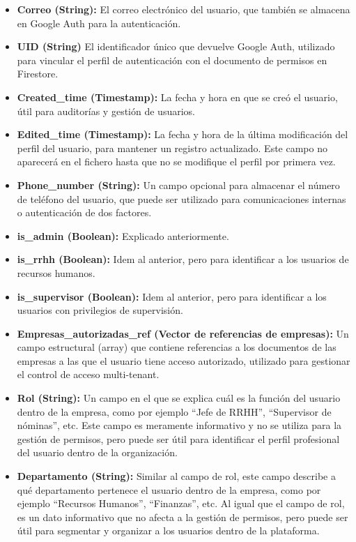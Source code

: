 \begin{itemize}
    \item \textbf{Correo (String): } El correo electrónico del usuario, que también se almacena en Google Auth para la autenticación.
    \item \textbf{UID (String)} El identificador único que devuelve Google Auth, utilizado para vincular el perfil de autenticación con el documento de permisos en Firestore.
    \item \textbf{Created\_time (Timestamp):} La fecha y hora en que se creó el usuario, útil para auditorías y gestión de usuarios.
    \item \textbf{Edited\_time (Timestamp):} La fecha y hora de la última modificación del perfil del usuario, para mantener un registro actualizado. Este campo no aparecerá en el fichero hasta que no se modifique el perfil por primera vez.
    \item \textbf{Phone\_number (String):} Un campo opcional para almacenar el número de teléfono del usuario, que puede ser utilizado para comunicaciones internas o autenticación de dos factores.
    \item \textbf{is\_admin (Boolean):} Explicado anteriormente.
    \item \textbf{is\_rrhh (Boolean):} Idem al anterior, pero para identificar a los usuarios de recursos humanos.
    \item \textbf{is\_supervisor (Boolean):} Idem al anterior, pero para identificar a los usuarios con privilegios de supervisión.
    \item \textbf{Empresas\_autorizadas\_ref (Vector de referencias de empresas):} Un campo estructural (array) que contiene referencias a los documentos de las empresas a las que el usuario tiene acceso autorizado, utilizado para gestionar el control de acceso multi-tenant.
    \item \textbf{Rol (String):} Un campo en el que se explica cuál es la función del usuario dentro de la empresa, como por ejemplo ``Jefe de RRHH'', ``Supervisor de nóminas'', etc. Este campo es meramente informativo y no se utiliza para la gestión de permisos, pero puede ser útil para identificar el perfil profesional del usuario dentro de la organización.
    \item \textbf{Departamento (String):} Similar al campo de rol, este campo describe a qué departamento pertenece el usuario dentro de la empresa, como por ejemplo ``Recursos Humanos'', ``Finanzas'', etc. Al igual que el campo de rol, es un dato informativo que no afecta a la gestión de permisos, pero puede ser útil para segmentar y organizar a los usuarios dentro de la plataforma.

\end{itemize}
